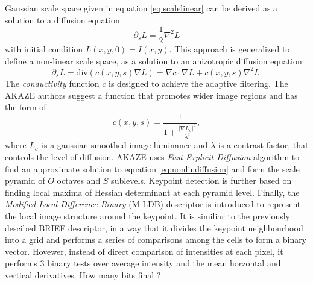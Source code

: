 Gaussian scale space given in equation \ref{eq:scalelinear} can be derived as a solution to a diffusion equation
\begin{equation}
\partial_s L = \frac{1}{2}\nabla^2L
\end{equation}
with initial condition $L(x,y,0) = I(x,y)$. This approach is generalized to define a non-linear scale space, as a solution to an anizotropic diffusion equation
\begin{equation}
\partial_s L = \mathrm{div}\left( c(x,y,s) \nabla L \right) = \nabla c \cdot \nabla L + c(x,y,s)\nabla^2L.
\label{eq:nonlindiffusion}
\end{equation}
The \textit{conductivity} function $c$ is designed to achieve the adaptive filtering. The AKAZE authors suggest a function that promotes wider image regions and has the form of
\begin{equation}
c(x,y,s) = \frac{1}{1 + \frac{|\nabla L_{\sigma}|^2}{\lambda^2}},
\end{equation}
where $L_\sigma$ is a gaussian smoothed image luminance and $\lambda$ is a contrast factor, that controls the level of diffusion. AKAZE uses \textit{Fast Explicit Diffusion} algorithm to find an approximate solution to equation \ref{eq:nonlindiffusion} and form the scale pyramid of $O$ octaves and $S$ sublevels. Keypoint detection is further based on finding local maxima of Hessian determinant at each pyramid level. Finally, the \textit{Modified-Local Difference Binary} (M-LDB) descriptor is introduced to represent the local image structure around the keypoint. It is similiar to the previously descibed BRIEF descriptor, in a way that it divides the keypoint neighbourhood into a grid and performs a series of comparisons among the cells to form a binary vector. Hovewer, instead of direct comparison of intensities at each pixel, it performs 3 binary tests over average intensity and the mean horzontal and vertical derivatives. How many bits final ?

